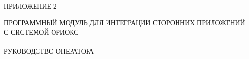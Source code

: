 \begin{flushright}
  ПРИЛОЖЕНИЕ 2
\end{flushright}
\vfill
\begin{center}
  \uppercase{Программный модуль для интеграции сторонних приложений с системой ОРИОКС\\~\\
  Руководство оператора}
\end{center}
\vfill

\setcounter{page}{1}
\thispagestyle{empty}
